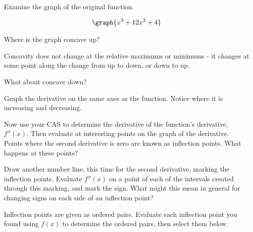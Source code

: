 \documentclass{ximera}
\begin{document}
\begin{question}
Examine the graph of the original function.

\[
\graph{x^3+12x^2+4}
\]

Where is the graph concave up?
\begin{multipleChoice}
\choice{$[0,1]$}
\choice[correct]{$[-4, \infty)$}
\choice{$(-\infty, 0]$}
\choice{$[0,260]$}
\choice{$[4,260]$}
\end{multipleChoice}
\begin{feedback}
Concavity does not change at the relative maximums or minimums - it changes at some point along the change from up to down, or down to up.
\end{feedback}

What about concave down?

\begin{multipleChoice}
\choice{$[0,1]$}
\choice{$[-4, \infty)$}
\choice[correct]{$(-\infty, -4]$}
\choice{$[0,260]$}
\choice{$[4,260]$}
\end{multipleChoice}

Graph the derivative on the same axes as the function. Notice where it is increasing and decreasing.

Now use your CAS to determine the derivative of the function's derivative, $f''(x)$. Then evaluate at interesting points on the graph of the derivative. Points where the second derivative is zero are known as inflection points. What happens at these points?

\begin{multipleChoice}
\end{multipleChoice}

Draw another number line, this time for the second derivative, marking the inflection points. Evaluate $f''(x)$ on a point of each of the intervals created through this marking, and mark the sign. What might this mean in general for changing signs on each side of an inflection point?

\begin{selectAll}
\end{selectAll}

Inflection points are given as ordered pairs. Evaluate each inflection point you found using $f(x)$ to determine the ordered pairs, then select them below.
\begin{selectAll}
\end{selectAll}
\end{question}
\end{document}
